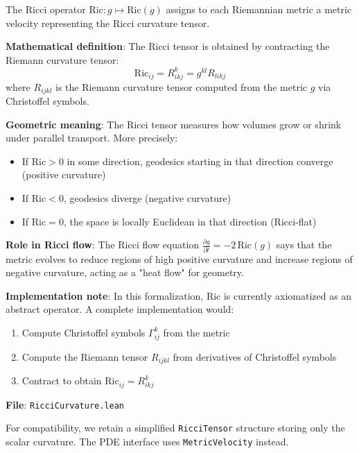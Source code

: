 \begin{definition}
\label{def:ricci_of_metric}
The Ricci operator $\mathrm{Ric} : g \mapsto \mathrm{Ric}(g)$ assigns to each Riemannian metric a metric velocity representing the Ricci curvature tensor.

\textbf{Mathematical definition}: The Ricci tensor is obtained by contracting the Riemann curvature tensor:
\[ \mathrm{Ric}_{ij} = R^k_{ikj} = g^{kl} R_{likj} \]
where $R_{ijkl}$ is the Riemann curvature tensor computed from the metric $g$ via Christoffel symbols.

\textbf{Geometric meaning}: The Ricci tensor measures how volumes grow or shrink under parallel transport. More precisely:
\begin{itemize}
\item If $\mathrm{Ric} > 0$ in some direction, geodesics starting in that direction converge (positive curvature)
\item If $\mathrm{Ric} < 0$, geodesics diverge (negative curvature)
\item If $\mathrm{Ric} = 0$, the space is locally Euclidean in that direction (Ricci-flat)
\end{itemize}

\textbf{Role in Ricci flow}: The Ricci flow equation $\frac{\partial g}{\partial t} = -2\,\mathrm{Ric}(g)$ says that the metric evolves to reduce regions of high positive curvature and increase regions of negative curvature, acting as a "heat flow" for geometry.

\textbf{Implementation note}: In this formalization, $\mathrm{Ric}$ is currently axiomatized as an abstract operator. A complete implementation would:
\begin{enumerate}
\item Compute Christoffel symbols $\Gamma^k_{ij}$ from the metric
\item Compute the Riemann tensor $R_{ijkl}$ from derivatives of Christoffel symbols
\item Contract to obtain $\mathrm{Ric}_{ij} = R^k_{ikj}$
\end{enumerate}

\textbf{File}: \texttt{RicciCurvature.lean}
\end{definition}

\begin{definition}
\label{def:ricci_tensor}
\leanok
{}
For compatibility, we retain a simplified \texttt{RicciTensor} structure storing only the scalar curvature. The PDE interface uses \texttt{MetricVelocity} instead.
\end{definition}

